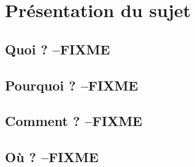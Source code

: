 \part{Présentation du sujet}

\clearemptydoublepage
\chapter{Quoi ? --FIXME} %


\clearemptydoublepage
\chapter{Pourquoi ? --FIXME} %


\clearemptydoublepage
\chapter{Comment ? --FIXME}


\clearemptydoublepage
\chapter{Où ? --FIXME}
